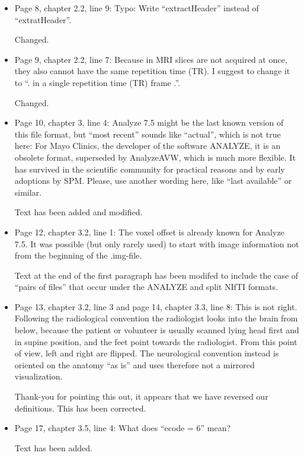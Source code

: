 \documentclass[11pt]{article}
\begin{document}
\begin{itemize}
\item Page 8, chapter 2.2, line 9: Typo: Write ``extractHeader''
  instead of ``extratHeader''.

  Changed.

\item Page 9, chapter 2.2, line 7: Because in MRI slices are not
  acquired at once, they also cannot have the same repetition time
  (TR). I suggest to change it to ``. in a single repetition time (TR)
  frame .''.

  Changed.

\item Page 10, chapter 3, line 4: Analyze 7.5 might be the last known
  version of this file format, but ``most recent'' sounds like
  ``actual'', which is not true here: For Mayo Clinics, the developer
  of the software ANALYZE, it is an obsolete format, superseded by
  AnalyzeAVW, which is much more flexible. It has survived in the
  scientific community for practical reasons and by early adoptions by
  SPM. Please, use another wording here, like ``last available'' or
  similar.

  Text has been added and modified.

\item Page 12, chapter 3.2, line 1: The voxel offset is already known
  for Analyze 7.5. It was possible (but only rarely used) to start
  with image information not from the beginning of the .img-file.

  Text at the end of the first paragraph has been modifed to include
  the case of ``pairs of files'' that occur under the ANALYZE and
  split NIfTI formats.

\item Page 13, chapter 3.2, line 3 and page 14, chapter 3.3, line 8:
  This is not right. Following the radiological convention the
  radiologist looks into the brain from below, because the patient or
  volunteer is usually scanned lying head first and in supine
  position, and the feet point towards the radiologist. From this
  point of view, left and right are flipped. The neurological
  convention instead is oriented on the anatomy ``as is'' and uses
  therefore not a mirrored visualization.

  Thank-you for pointing this out, it appears that we have reversed our
  definitions.  This has been corrected.

\item Page 17, chapter 3.5, line 4: What does ``ecode = 6'' mean?

  Text has been added.


\end{itemize}
\end{document}
